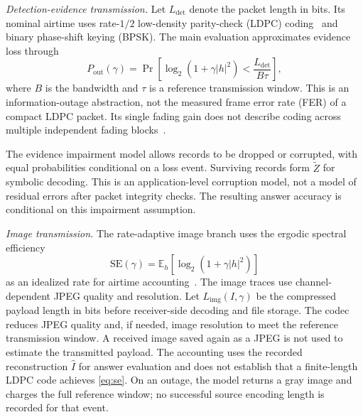 \emph{Detection-evidence transmission.}\label{subsec:detphy}
Let $L_{\mathrm{det}}$ denote the packet length in bits. Its nominal
airtime uses rate-$1/2$ low-density parity-check (LDPC)
coding~\cite{gallager1962ldpc} and binary phase-shift keying (BPSK).
The main evaluation approximates evidence loss through
\begin{equation}\label{eq:outage}
P_{\mathrm{out}}(\gamma)
=\Pr\!\left[\log_2(1+\gamma|h|^2)
 <\frac{L_{\mathrm{det}}}{B\tau}\right],
\end{equation}
where $B$ is the bandwidth and $\tau$ is a reference transmission
window. This is an information-outage abstraction, not the measured
frame error rate (FER) of a compact LDPC packet. Its single fading
gain does not describe coding across multiple independent fading
blocks~\cite{tse2005fundamentals}.

The evidence impairment model allows records to be dropped or
corrupted, with equal probabilities conditional on a loss event.
Surviving records form $\tilde Z$ for symbolic decoding. This is an
application-level corruption model, not a model of residual errors
after packet integrity checks. The resulting answer accuracy is
conditional on this impairment assumption.

\emph{Image transmission.}\label{subsec:imgphy}
The rate-adaptive image branch uses the ergodic spectral efficiency
\begin{equation}\label{eq:se}
\mathrm{SE}(\gamma)
=\mathbb{E}_{h}[\log_2(1+\gamma|h|^2)]
\end{equation}
as an idealized rate for airtime accounting~\cite{tse2005fundamentals}.
The image traces use channel-dependent JPEG quality and resolution.
Let $L_{\mathrm{img}}(I,\gamma)$ be the compressed payload length
in bits before receiver-side decoding and file storage. The codec
reduces JPEG quality and, if needed, image resolution to meet the
reference transmission window. A received image saved again as a
JPEG is not used to estimate the transmitted payload.
The accounting uses the recorded reconstruction $\hat I$ for answer
evaluation and does not establish that a finite-length LDPC code
achieves \eqref{eq:se}. On an outage, the model returns a gray
image and charges the full reference window; no successful source
encoding length is recorded for that event.

